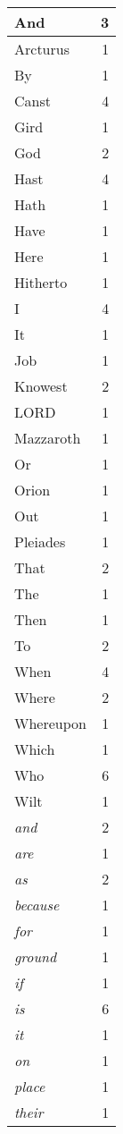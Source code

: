 \begin{center}
\begin{longtable}{l|r}
\hline \hline
\endlastfoot
And & 3 \\ \hline
Arcturus & 1 \\ \hline
By & 1 \\ \hline
Canst & 4 \\ \hline
Gird & 1 \\ \hline
God & 2 \\ \hline
Hast & 4 \\ \hline
Hath & 1 \\ \hline
Have & 1 \\ \hline
Here & 1 \\ \hline
Hitherto & 1 \\ \hline
I & 4 \\ \hline
It & 1 \\ \hline
Job & 1 \\ \hline
Knowest & 2 \\ \hline
LORD & 1 \\ \hline
Mazzaroth & 1 \\ \hline
Or & 1 \\ \hline
Orion & 1 \\ \hline
Out & 1 \\ \hline
Pleiades & 1 \\ \hline
That & 2 \\ \hline
The & 1 \\ \hline
Then & 1 \\ \hline
To & 2 \\ \hline
When & 4 \\ \hline
Where & 2 \\ \hline
Whereupon & 1 \\ \hline
Which & 1 \\ \hline
Who & 6 \\ \hline
Wilt & 1 \\ \hline
\emph{and} & 2 \\ \hline
\emph{are} & 1 \\ \hline
\emph{as} & 2 \\ \hline
\emph{because} & 1 \\ \hline
\emph{for} & 1 \\ \hline
\emph{ground} & 1 \\ \hline
\emph{if} & 1 \\ \hline
\emph{is} & 6 \\ \hline
\emph{it} & 1 \\ \hline
\emph{on} & 1 \\ \hline
\emph{place} & 1 \\ \hline
\emph{their} & 1 \\ \hline

\end{longtable}
\end{center}
